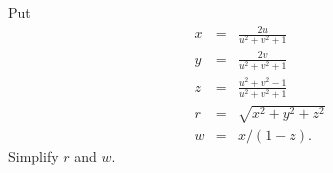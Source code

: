 \documentclass[a4paper,10pt]{amsbook}
\numberwithin{example}{chapter}
\begin{document}
\begin{exercise}\label{ex-stereo}
 Put
 \begin{eqnarray*}
   x &=& \frac{2u}{u^2+v^2+1} \\
   y &=& \frac{2v}{u^2+v^2+1} \\
   z &=& \frac{u^2+v^2-1}{u^2+v^2+1} \\
   r &=& \sqrt{x^2+y^2+z^2} \\
   w &=& x/(1-z).
 \end{eqnarray*}
 Simplify $r$ and $w$.
\end{exercise}
\end{document}
